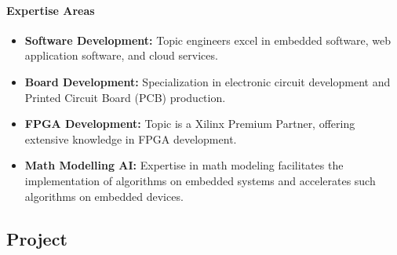 \documentclass{article}
\begin{document}
\paragraph{Expertise Areas} 
\begin{itemize} 
    \item \textbf{Software Development:}
        Topic engineers excel in embedded software, web application software, and cloud
        services. 
    \item \textbf{Board Development:} Specialization in electronic circuit
        development and Printed Circuit Board (PCB) production. 
    \item \textbf{FPGA Development:} Topic is a Xilinx Premium Partner, offering extensive knowledge in
        FPGA development. 
    \item \textbf{Math Modelling AI:} Expertise in math modeling
        facilitates the implementation of algorithms on embedded systems and accelerates
        such algorithms on embedded devices. 
\end{itemize}

\subsection{Project}
\label{project-background}

\end{document}
